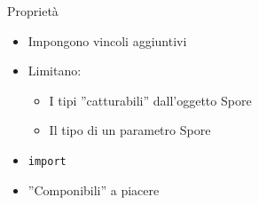 \begin{frame}{Proprietà}
	\begin{itemize}
		\item Impongono vincoli aggiuntivi 
		\item Limitano:
		\begin{itemize}
			\item I tipi ''catturabili'' dall'oggetto Spore
			\item Il tipo di un parametro Spore
		\end{itemize}
		\item \texttt{import}
		\item ''Componibili'' a piacere 
	\end{itemize}
\end{frame}